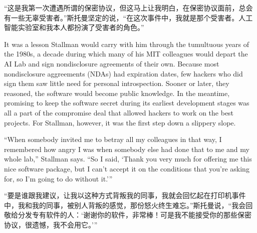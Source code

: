 \ifdefined\chs
``这是我第一次遭遇所谓的保密协议，但这马上让我明白，在保密协议面前，总会有一些无辜受害者。''斯托曼坚定的说，``在这次事件中，我就是那个受害者。人工智能实验室和我本人都扮演了受害者的角色。''
\fi

\ifdefined\eng
It was a lesson Stallman would carry with him through the tumultuous years of the 1980s, a decade during which many of his MIT colleagues would depart the AI Lab and sign nondisclosure agreements of their own. Because most nondisclosure aggreements (NDAs) had expiration dates, few hackers who did sign them saw little need for personal introspection. Sooner or later, they reasoned, the software would become public knowledge. In the meantime, promising to keep the software secret during its earliest development stages was all a part of the compromise deal that allowed hackers to work on the best projects. For Stallman, however, it was the first step down a slippery slope.
\fi

\ifdefined\eng
``When somebody invited me to betray all my colleagues in that way, I remembered how angry I was when somebody else had done that to me and my whole lab,'' Stallman says. ``So I said, `Thank you very much for offering me this nice software package, but I can't accept it on the conditions that you're asking for, so I'm going to do without it.'\hspace{0.01in}''
\fi

\ifdefined\chs
``要是谁跟我建议，让我以这种方式背叛我的同事，我就会回忆起在打印机事件中，我和我的同事，被别人背叛的感觉，那份怒火终生难忘。''斯托曼说，``我会回敬给分发专有软件的人：`谢谢你的软件，非常棒！可是我不能接受你的那些保密协议，很遗憾，我不会用它。'\hspace{0.01in}''
\fi




